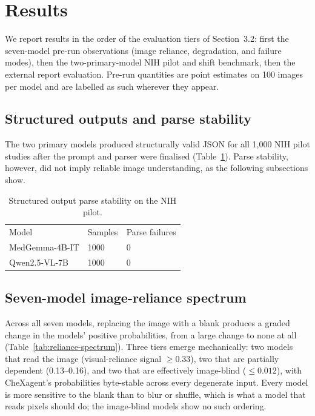 \section{Results}

We report results in the order of the evaluation tiers of Section~3.2: first the
seven-model pre-run observations (image reliance, degradation, and failure
modes), then the two-primary-model NIH pilot and shift benchmark, then the
external report evaluation. Pre-run quantities are point estimates on 100 images
per model and are labelled as such wherever they appear.

\subsection{Structured outputs and parse stability}

The two primary models produced structurally valid JSON for all 1,000 NIH pilot studies after the prompt and parser were finalised (Table~\ref{tab:parse}). Parse stability, however, did not imply reliable image understanding, as the following subsections show.

\begin{table}[t]
\centering
\small
\begin{tabular}{lll}
\hline
Model & Samples & Parse failures \\
MedGemma-4B-IT & 1000 & 0 \\
Qwen2.5-VL-7B & 1000 & 0 \\
\hline
\end{tabular}
\caption{Structured output parse stability on the NIH pilot.}
\label{tab:parse}
\end{table}

\subsection{Seven-model image-reliance spectrum}

Across all seven models, replacing the image with a blank produces a graded
change in the models' positive probabilities, from a large change to none at all
(Table~\ref{tab:reliance-spectrum}). Three tiers emerge mechanically: two models
that read the image (visual-reliance signal $\geq 0.33$), two that are partially
dependent (0.13--0.16), and two that are effectively image-blind ($\leq 0.012$),
with CheXagent's probabilities byte-stable across every degenerate input. Every
model is more sensitive to the blank than to blur or shuffle, which is what a
model that reads pixels should do; the image-blind models show no such ordering.

